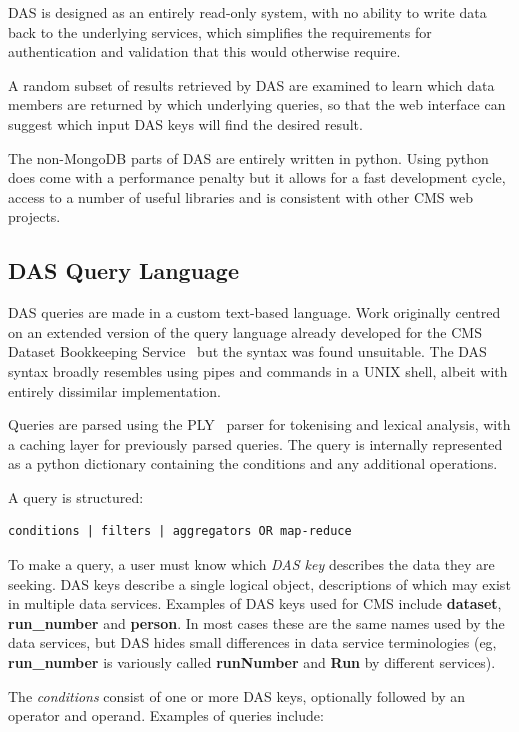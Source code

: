 \documentclass[a4paper]{jpconf}
\begin{document}
DAS is designed as an entirely read-only system, with no ability to write data back to the underlying services, which simplifies the requirements for authentication and validation that this would otherwise require.

A random subset of results retrieved by DAS are examined to learn which data members are returned by which underlying queries, so that the web interface can suggest which input DAS keys will find the desired result.

The non-MongoDB parts of DAS are entirely written in python. Using python does come with a performance penalty but it allows for a fast development cycle, access to a number of useful libraries and is consistent with other CMS web projects.

\subsection{\label{dasql}DAS Query Language}

DAS queries are made in a custom text-based language. Work originally centred on an extended version of the query language already developed for the CMS Dataset Bookkeeping Service~\cite{dbsql} but the syntax was found unsuitable. The DAS syntax broadly resembles using pipes and commands in a UNIX shell, albeit with entirely dissimilar implementation.

Queries are parsed using the PLY~\cite{ply} parser for tokenising and lexical analysis, with a caching layer for previously parsed queries. The query is internally represented as a python dictionary containing the conditions and any additional operations.

A query is structured:

\begin{verbatim}
conditions | filters | aggregators OR map-reduce 
\end{verbatim}

To make a query, a user must know which \emph{DAS key} describes the data they are seeking. DAS keys describe a single logical object, descriptions of which may exist in multiple data services. Examples of DAS keys used for CMS include \textbf{dataset}, \textbf{run\_number} and \textbf{person}. In most cases these are the same names used by the data services, but DAS hides small differences in data service terminologies (eg, \textbf{run\_number} is variously called \textbf{runNumber} and \textbf{Run} by different services).

The \emph{conditions} consist of one or more DAS keys, optionally followed by an operator and operand. Examples of queries include:
\end{document}
